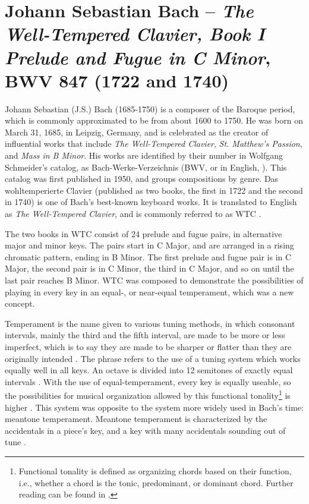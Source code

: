 \chapter[J.S. Bach and \textit{The Well-Tempered Clavier, Book I} BWV 847]{Johann Sebastian Bach – \textit{The Well-Tempered Clavier, Book I Prelude and Fugue in C Minor}, BWV 847 (1722 and 1740)}\label{bach}

Johann Sebastian (J.S.) Bach (1685-1750) is a composer of the Baroque period, which is commonly approximated to be from about 1600 to 1750. He was born on March 31, 1685, in Leipzig, Germany, and is celebrated as the creator of influential works that include \textit{The Well-Tempered Clavier}, \textit{St. Matthew's Passion}, and \textit{Mass in B Minor}. His works are identified by their number in Wolfgang Schmeider's catalog, as Bach-Werke-Verzeichnis (BWV, or in English, ). This catalog was first published in 1950, and groups compositions by genre. Das wohltemperierte Clavier (published as two books, the first in 1722 and the second in 1740) is one of Bach's best-known keyboard works. It is translated to English as \textit{The Well-Tempered Clavier}, and is commonly referred to as WTC \autocite{Lindley_2001}.

The two books in WTC consist of 24 prelude and fugue pairs, in alternative major and minor keys. The pairs start in C Major, and are arranged in a rising chromatic pattern, ending in B Minor. The first prelude and fugue pair is in C Major, the second pair is in C Minor, the third in C\musSharp{} Major, and so on until the last pair reaches B Minor. WTC was composed to demonstrate the possibilities of playing in every key in an equal-, or near-equal temperament, which was a new concept. 

Temperament is the name given to various tuning methods, in which consonant intervals, mainly the third and the fifth interval, are made to be more or less imperfect, which is to say they are made to be sharper or flatter than they are originally intended \autocite{Grove_1895}. The phrase  refers to the use of a tuning system which works equally well in all keys. An octave is divided into 12 semitones of exactly equal intervals \autocite{Whitcomb_2017}. With the use of equal-temperament, every key is equally useable, so the possibilities for musical organization allowed by this functional tonality\footnote{Functional tonality is defined as organizing chords based on their function, i.e., whether a chord is the tonic, predominant, or dominant chord. Further reading can be found in \citeauthor{Marshall_Emery_2019}, } is higher \autocite{Marshall_Emery_2019}. This system was opposite to the system more widely used in Bach's time: meantone temperament. Meantone temperament is characterized by the accidentals in a piece's key, and a key with many accidentals sounding out of tune \autocite{Grove_1895}. 

